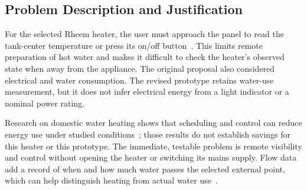 \subsection{Problem Description and Justification}

For the selected Rheem heater, the user must approach the panel to read the tank-center temperature or press its on/off button~\cite{rheemmanual}. This limits remote preparation of hot water and makes it difficult to check the heater's observed state when away from the appliance. The original proposal also considered electrical and water consumption. The revised prototype retains water-use measurement, but it does not infer electrical energy from a light indicator or a nominal power rating.

Research on domestic water heating shows that scheduling and control can reduce energy use under studied conditions~\cite{booysen2019}; those results do not establish savings for this heater or this prototype. The immediate, testable problem is remote visibility and control without opening the heater or switching its mains supply. Flow data add a record of when and how much water passes the selected external point, which can help distinguish heating from actual water use~\cite{lee2021,pirow2018}.

